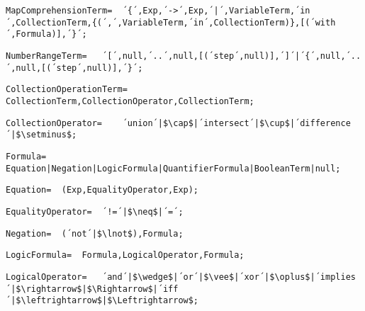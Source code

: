 \documentclass{article}
\begin{document}
    \begin{lstlisting}[mathescape=true]
     MapComprehensionTerm= 	´{´,Exp,´->´,Exp,´|´,VariableTerm,´in´,CollectionTerm,{(´,´,VariableTerm,´in´,CollectionTerm)},[(´with´,Formula)],´}´;
    \end{lstlisting}
    
    \begin{lstlisting}[mathescape=true]
     NumberRangeTerm= 	´[´,null,´..´,null,[(´step´,null)],´]´|´{´,null,´..´,null,[(´step´,null)],´}´;
    \end{lstlisting}
    
    \begin{lstlisting}[mathescape=true]
     CollectionOperationTerm= 	CollectionTerm,CollectionOperator,CollectionTerm;
    \end{lstlisting}
    
    \begin{lstlisting}[mathescape=true]
     CollectionOperator= 	´union´|$\cap$|´intersect´|$\cup$|´difference´|$\setminus$;
    \end{lstlisting}
    
    \begin{lstlisting}[mathescape=true]
     Formula= 	Equation|Negation|LogicFormula|QuantifierFormula|BooleanTerm|null;
    \end{lstlisting}
    
    \begin{lstlisting}[mathescape=true]
     Equation= 	(Exp,EqualityOperator,Exp);
    \end{lstlisting}
    
    \begin{lstlisting}[mathescape=true]
     EqualityOperator= 	´!=´|$\neq$|´=´;
    \end{lstlisting}
    
    \begin{lstlisting}[mathescape=true]
     Negation= 	(´not´|$\lnot$),Formula;
    \end{lstlisting}
    
    \begin{lstlisting}[mathescape=true]
     LogicFormula= 	Formula,LogicalOperator,Formula;
    \end{lstlisting}
    
    \begin{lstlisting}[mathescape=true]
     LogicalOperator= 	´and´|$\wedge$|´or´|$\vee$|´xor´|$\oplus$|´implies´|$\rightarrow$|$\Rightarrow$|´iff´|$\leftrightarrow$|$\Leftrightarrow$;
    \end{lstlisting}
    
\end{document}
